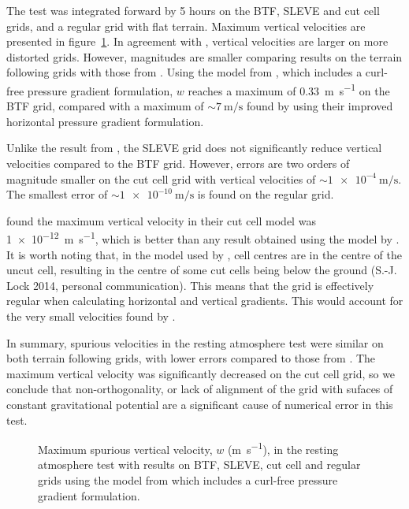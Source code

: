 \documentclass[twocol]{ametsoc}
\begin{document}
The test was integrated forward by 5 hours on the BTF, SLEVE and cut cell grids, and a regular grid with flat terrain.  Maximum vertical velocities are presented in figure~\ref{fig:resting}.  In agreement with \citet{klemp2011}, vertical velocities are larger on more distorted grids.  However, magnitudes are smaller comparing results on the terrain following grids with those from \citet{klemp2011}.  Using the model from \citet{weller-shahrokhi2014}, which includes a curl-free pressure gradient formulation, $w$ reaches a maximum of \SI{0.33}{\meter\per\second} on the BTF grid, compared with a maximum of \(\sim \SI{7}{\meter\per\second}\) found by \citet{klemp2011} using their improved horizontal pressure gradient formulation.

Unlike the result from \citet{klemp2011}, the SLEVE grid does not significantly reduce vertical velocities compared to the BTF grid.  However, errors are two orders of magnitude smaller on the cut cell grid with vertical velocities of \(\sim \SI{1e-4}{\meter\per\second}\).  The smallest error of \(\sim \SI{1e-10}{\meter\per\second}\) is found on the regular grid.

\citet{good2014} found the maximum vertical velocity in their cut cell model was \SI{1e-12}{\meter\per\second}, which is better than any result obtained using the model by \citet{weller-shahrokhi2014}.  It is worth noting that, in the model used by \citet{good2014}, cell centres are in the centre of the uncut cell, resulting in the centre of some cut cells being below the ground (S.-J. Lock 2014, personal communication).  This means that the grid is effectively regular when calculating horizontal and vertical gradients.  This would account for the very small velocities found by \citet{good2014}.

In summary, spurious velocities in the resting atmosphere test were similar on both terrain following grids, with lower errors compared to those from \citet{klemp2011}.  The maximum vertical velocity was significantly decreased on the cut cell grid, so we conclude that non-orthogonality, or lack of alignment of the grid with sufaces of constant gravitational potential are a significant cause of numerical error in this test.

\begin{figure}
	\centering
%
	\caption{Maximum spurious vertical velocity, \(w\) (\si{\meter\per\second}), in the resting atmosphere test with results on BTF, SLEVE, cut cell and regular grids using the model from \citet{weller-shahrokhi2014} which includes a curl-free pressure gradient formulation.}
	\label{fig:resting}
\end{figure}
\end{document}

